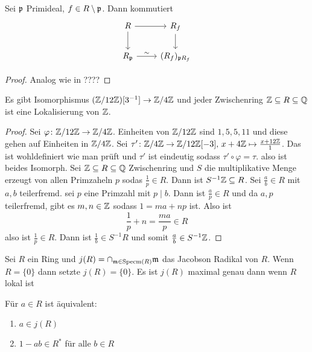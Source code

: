 \begin{Satz}
    Sei $\mathfrak{p}$ Primideal, $f\in R\setminus \mathfrak{p}$. 
    Dann kommutiert 
    $$%
\begin{tikzcd}
R \arrow[r] \arrow[d]      & R_f \arrow[d]      \\
R_\frakp \arrow[r, "\sim"] & (R_f)_{\frakp R_f}
\end{tikzcd}$$
\end{Satz}
\begin{proof}
    Analog wie in ????
\end{proof}
\begin{Bsp}
    Es gibt Isomorphismus $(\mathbb{Z}/12\mathbb{Z})[3^{-1}]\to \mathbb{Z}/4\mathbb{Z}$ und jeder Zwischenring $\mathbb{Z}\subseteq R\subseteq \mathbb{Q}$ ist eine Lokalisierung von $\mathbb{Z}$.
\end{Bsp}
\begin{proof}
    Sei $\varphi\colon \mathbb{Z}/12\mathbb{Z}\to \mathbb{Z}/4\mathbb{Z} $. Einheiten von $\mathbb{Z}/12\mathbb{Z}$ sind $1,5,5,11$ und diese gehen auf Einheiten in $\mathbb{Z}/4\mathbb{Z}$.
    Sei $\tau'\colon \mathbb{Z}/4\mathbb{Z}\to \mathbb{Z}/12\mathbb{Z}[-3],\, x+4\mathbb{Z}\mapsto \frac{x+12\mathbb{Z}}{1}$. Das ist wohldefiniert wie man prüft und $\tau'$ ist eindeutig sodass $\tau'\circ\varphi=\tau.$ also ist beides Isomorph.
    Sei $\mathbb{Z}\subseteq R\subseteq \mathbb{Q}$ Zwischenring und $S$ die multiplikative Menge erzeugt von allen Primzaheln $p$ sodas $\frac 1 p\in R$. Dann ist $S^{-1}\mathbb{Z}\subseteq R$. Sei $\frac a b\in R$ mit $a,b$ teilerfremd. sei $p$ eine Primzahl mit $p\mid b$. Dann ist $\frac a p\in R$ und da $a,p$ teilerfremd, gibt es $m,n\in\mathbb{Z}$ sodass $1=ma+np$ ist. Also ist $$\frac 1 p+n=\frac{ma}{p}\in R$$ also ist $\frac 1 p\in R$. Dann ist $\frac 1 b\in S^{-1}R$ und somit $\frac a b\in S^{-1}\mathbb{Z}$.
\end{proof}
\begin{Def}
    Sei $R$ ein Ring und $j(R)=\cap_{\mathfrak{m}\in\operatorname{Specm}(R)}\mathfrak{m}$ das Jacobson Radikal von $R$. 
    Wenn $R=\{0\}$ dann setzte $j(R)=\{0\}$.
    Es ist $j(R)$ maximal genau dann wenn $R$ lokal ist
\end{Def}
\begin{Bem}
    Für $a\in R$ ist äquivalent:
    \begin{enumerate}
        \item $a\in j(R)$
        \item $1-ab\in R^*$ für alle $b\in R$
    \end{enumerate}
\end{Bem}
